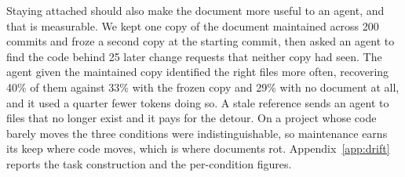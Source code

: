 Staying attached should also make the document more useful to an agent, and that is measurable. We kept one copy of the document maintained across 200 commits and froze a second copy at the starting commit, then asked an agent to find the code behind 25 later change requests that neither copy had seen. The agent given the maintained copy identified the right files more often, recovering 40\% of them against 33\% with the frozen copy and 29\% with no document at all, and it used a quarter fewer tokens doing so. A stale reference sends an agent to files that no longer exist and it pays for the detour. On a project whose code barely moves the three conditions were indistinguishable, so maintenance earns its keep where code moves, which is where documents rot. Appendix~\ref{app:drift} reports the task construction and the per-condition figures.
